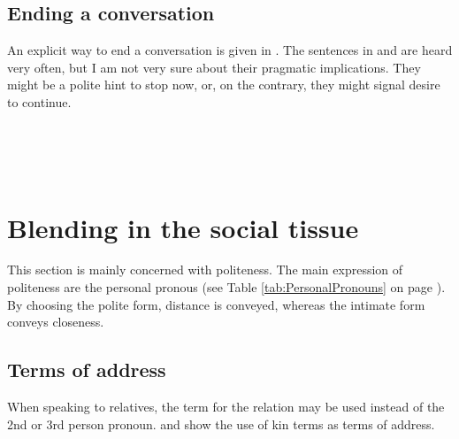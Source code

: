 \subsection{Ending a conversation}\label{sec:pragm:...endaconversation}
An explicit way to end a conversation is given in . The sentences in  and  are heard very often, but I am not very sure about their pragmatic implications. They might be a polite hint to stop now, or, on the contrary, they might signal desire to continue.

 \\

 \\

 \\




\section{Blending in the social tissue}\label{sec:pragm:Blendinginthesocialtissue}
This section is mainly concerned with politeness. The main expression of politeness are the personal pronous (see Table \ref{tab:PersonalPronouns} on page \pageref{tab:PersonalPronouns}). By choosing the polite form, distance is conveyed, whereas the intimate form conveys closeness.

\subsection{Terms of address}
When speaking to  relatives, the term for the relation may be used instead of the 2nd or 3rd person pronoun.  and  show the use of kin terms as terms of address.


